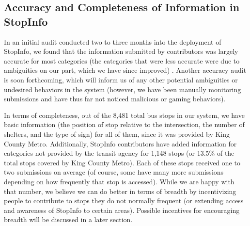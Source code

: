\subsection{Accuracy and Completeness of Information in StopInfo}

In an initial audit conducted two to three months into the deployment of StopInfo, we found that the information submitted by contributors was largely accurate for most categories (the categories that were less accurate were due to ambiguities on our part, which we have since improved) \cite{campbell-2014}. Another accuracy audit is soon forthcoming, which will inform us of any other potential ambiguities or undesired behaviors in the system (however, we have been manually monitoring submissions and have thus far not noticed malicious or gaming behaviors). 

In terms of completeness, out of the 8,481 total bus stops in our system, we have basic information (the position of stop relative to the intersection, the number of shelters, and the type of sign) for all of them, since it was provided by King County Metro. Additionally, StopInfo contributors have added information for categories not provided by the transit agency for 1,148 stops (or 13.5\% of the total stops covered by King County Metro). Each of these stops received one to two submissions on average (of course, some have many more submissions depending on how frequently that stop is accessed). While we are happy with that number, we believe we can do better in terms of breadth by incentivizing people to contribute to stops they do not normally frequent (or extending access and awareness of StopInfo to certain areas). Possible incentives for encouraging breadth will be discussed in a later section.
